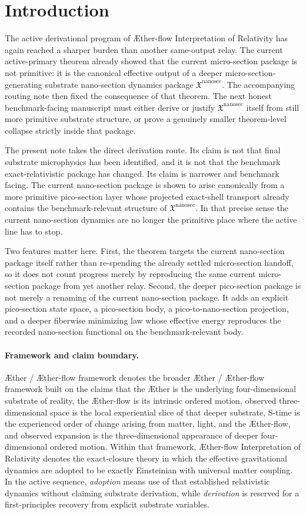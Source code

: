 \documentclass[11pt]{article}
\newcommand{\Aether}{\AE{}ther}
\newcommand{\Aflow}{\AE{}ther-flow}
\newcommand{\TheoryName}{\Aflow{} Interpretation of Relativity}
\newcommand{\TheoryProgram}{\Aether{} / \Aflow{} framework}
\newcommand{\NanoSectionPackage}{\mathfrak X^{\mathrm{nanosec}}}
\begin{document}
\section{Introduction}

The active derivational program of \TheoryName{} has again reached a sharper burden than another same-output relay. The current active-primary theorem already showed that the current micro-section package is not primitive: it is the canonical effective output of a deeper micro-section-generating substrate nano-section dynamics package \(\NanoSectionPackage\). The accompanying routing note then fixed the consequence of that theorem. The next honest benchmark-facing manuscript must either derive or justify \(\NanoSectionPackage\) itself from still more primitive substrate structure, or prove a genuinely smaller theorem-level collapse strictly inside that package.

The present note takes the direct derivation route. Its claim is not that final substrate microphysics has been identified, and it is not that the benchmark exact-relativistic package has changed. Its claim is narrower and benchmark facing. The current nano-section package is shown to arise canonically from a more primitive pico-section layer whose projected exact-shell transport already contains the benchmark-relevant structure of \(\NanoSectionPackage\). In that precise sense the current nano-section dynamics are no longer the primitive place where the active line has to stop.

Two features matter here. First, the theorem targets the current nano-section package itself rather than re-spending the already settled micro-section handoff, so it does not count progress merely by reproducing the same current micro-section package from yet another relay. Second, the deeper pico-section package is not merely a renaming of the current nano-section package. It adds an explicit pico-section state space, a pico-section body, a pico-to-nano-section projection, and a deeper fiberwise minimizing law whose effective energy reproduces the recorded nano-section functional on the benchmark-relevant body.

\paragraph{Framework and claim boundary.}
\TheoryProgram{} denotes the broader \Aether{} / \Aflow{} framework built on the claims that the \Aether{} is the underlying four-dimensional substrate of reality, the \Aflow{} is its intrinsic ordered motion, observed three-dimensional space is the local experiential slice of that deeper substrate, S-time is the experienced order of change arising from matter, light, and the \Aflow{}, and observed expansion is the three-dimensional appearance of deeper four-dimensional ordered motion. Within that framework, \TheoryName{} denotes the exact-closure theory in which the effective gravitational dynamics are adopted to be exactly Einsteinian with universal matter coupling. In the active sequence, \emph{adoption} means use of that established relativistic dynamics without claiming substrate derivation, while \emph{derivation} is reserved for a first-principles recovery from explicit substrate variables.
\end{document}
